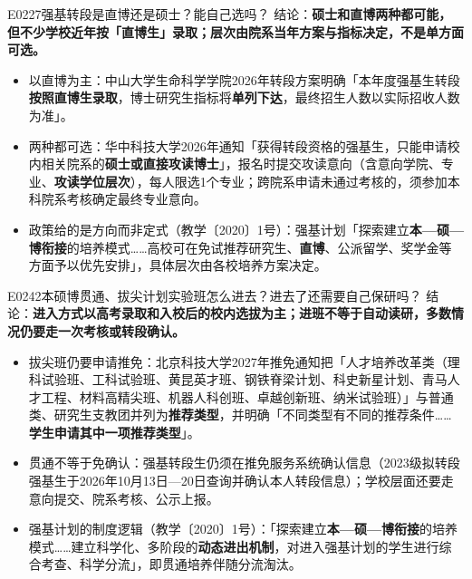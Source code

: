 \begin{qa}{E0227}{强基转段是直博还是硕士？能自己选吗？}
结论：\textbf{硕士和直博两种都可能，但不少学校近年按「直博生」录取；层次由院系当年方案与指标决定，不是单方面可选。}
\begin{itemize}
  \item 以直博为主：中山大学生命科学学院2026年转段方案明确「本年度强基生转段\textbf{按照直博生录取}，博士研究生指标将\textbf{单列下达}，最终招生人数以实际招收人数为准」。
  \item 两种都可选：华中科技大学2026年通知「获得转段资格的强基生，只能申请校内相关院系的\textbf{硕士或直接攻读博士}」，报名时提交攻读意向（含意向学院、专业、\textbf{攻读学位层次}），每人限选1个专业；跨院系申请未通过考核的，须参加本科院系考核确定最终专业意向。
  \item 政策给的是方向而非定式（教学〔2020〕1号）：强基计划「探索建立\textbf{本—硕—博衔接}的培养模式……高校可在免试推荐研究生、\textbf{直博}、公派留学、奖学金等方面予以优先安排」，具体层次由各校培养方案决定。
\end{itemize}
\end{qa}

\begin{qa}{E0242}{本硕博贯通、拔尖计划实验班怎么进去？进去了还需要自己保研吗？}
结论：\textbf{进入方式以高考录取和入校后的校内选拔为主；进班不等于自动读研，多数情况仍要走一次考核或转段确认。}
\begin{itemize}
  \item 拔尖班仍要申请推免：北京科技大学2027年推免通知把「人才培养改革类（理科试验班、工科试验班、黄昆英才班、钢铁脊梁计划、科史新星计划、青马人才工程、材料高精尖班、机器人科创班、卓越创新班、纳米试验班）」与普通类、研究生支教团并列为\textbf{推荐类型}，并明确「不同类型有不同的推荐条件……\textbf{学生申请其中一项推荐类型}」。
  \item 贯通不等于免确认：强基转段生仍须在推免服务系统确认信息（2023级拟转段强基生于2026年10月13日—20日查询并确认本人转段信息）；学校层面还要走意向提交、院系考核、公示上报。
  \item 强基计划的制度逻辑（教学〔2020〕1号）：「探索建立\textbf{本—硕—博衔接}的培养模式……建立科学化、多阶段的\textbf{动态进出机制}，对进入强基计划的学生进行综合考查、科学分流」，即贯通培养伴随分流淘汰。
\end{itemize}
\end{qa}

